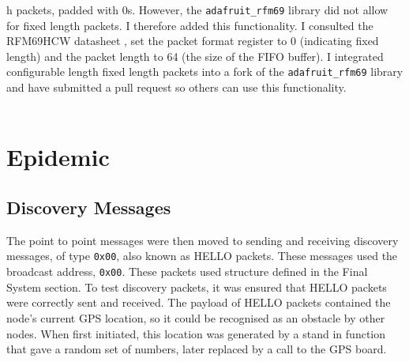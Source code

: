 \documentclass[12pt,a4paper]{report}
\begin{document}
h packets, padded with 0s. However, the \verb'adafruit_rfm69' library did not allow for fixed length packets. I therefore added this functionality. I consulted the RFM69HCW datasheet \cite{radiodata}, set the packet format register to 0 (indicating fixed length) and the packet length to 64 (the size of the FIFO buffer). I integrated configurable length fixed length packets into a fork of the \verb'adafruit_rfm69' library \cite{radiogit} and have submitted a pull request so others can use this functionality. \\ \\

\section{Epidemic}
\subsection{Discovery Messages}
The point to point messages were then moved to sending and receiving discovery messages, of type \verb'0x00', also known as HELLO packets. These messages used the broadcast address, \verb'0x00'. These packets used structure defined in the Final System section. To test discovery packets, it was ensured that HELLO packets were correctly sent and received. The payload of HELLO packets contained the node's current GPS location, so it could be recognised as an obstacle by other nodes. When first initiated, this location was generated by a stand in function that gave a random set of numbers, later replaced by a call to the GPS board. 
\end{document}
